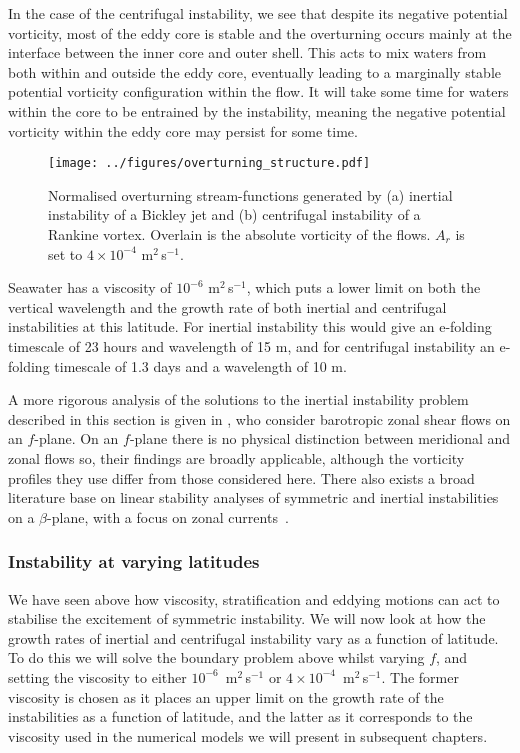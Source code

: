 In the case of the centrifugal instability, we see that despite its negative potential vorticity, most of the eddy core is stable and the overturning occurs mainly at the interface between the inner core and outer shell. This acts to mix waters from both within and outside the eddy core, eventually leading to a marginally stable potential vorticity configuration within the flow. It will take some time for waters within the core to be entrained by the instability, meaning the negative potential vorticity within the eddy core may persist for some time.

\begin{figure}
    \centering
    \texttt{[image: ../figures/overturning\_structure.pdf]}
    \caption{Normalised overturning stream-functions generated by (a) inertial instability of a Bickley jet and (b) centrifugal instability of a Rankine vortex. Overlain is the absolute vorticity of the flows. $A_r$ is set to $4 \times 10^{-4}$ m$^2\,$s$^{-1}$.}
    \label{fig:2DStructure}
\end{figure}

Seawater has a viscosity of $10^{-6}$ m$^{2}$\,s$^{-1}$, which puts a lower limit on both the vertical wavelength and the growth rate of both inertial and centrifugal instabilities at this latitude. For inertial instability this would give an e-folding timescale of 23 hours and wavelength of 15 m, and for centrifugal instability an e-folding timescale of 1.3 days and a wavelength of 10 m. 

A more rigorous analysis of the solutions to the inertial instability problem described in this section is given in \citet{Plougonven2009}, who consider barotropic zonal shear flows on an $f$-plane. On an $f$-plane there is no physical distinction between meridional and zonal flows so, their findings are broadly applicable, although the vorticity profiles they use differ from those considered here. There also exists a broad literature base on linear stability analyses of symmetric and inertial instabilities on a $\beta$-plane, with a focus on zonal currents~\citep[e.g.][]{Kloosterziel2017, Ribstein2014,Griffiths2003, Hua1997}.

\subsubsection{Instability at varying latitudes}
We have seen above how viscosity, stratification and eddying motions can act to stabilise the excitement of symmetric instability. We will now look at how the growth rates of inertial and centrifugal instability vary as a function of latitude. To do this we will solve the boundary problem above whilst varying $f$, and setting the viscosity to either $10^{-6}$~m$^{2}\,$s$^{-1}$ or $4 \times 10^{-4}$~m$^{2}\,$s$^{-1}$. The former viscosity is chosen as it places an upper limit on the growth rate of the instabilities as a function of latitude, and the latter as it corresponds to the viscosity used in the numerical models we will present in subsequent chapters.

